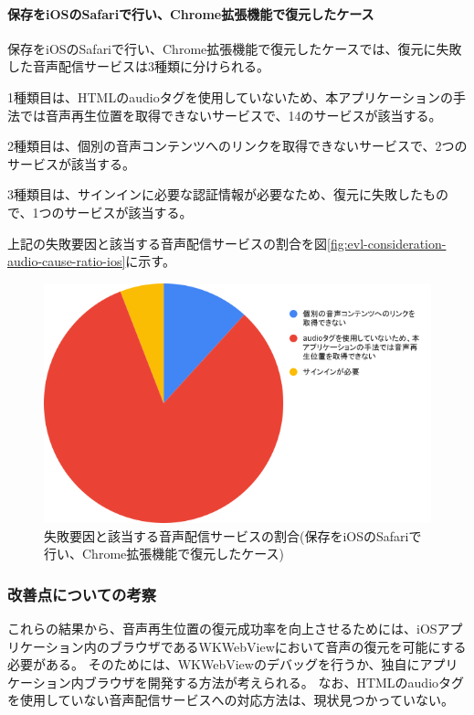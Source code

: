 \paragraph{保存をiOSのSafariで行い、Chrome拡張機能で復元したケース}
保存をiOSのSafariで行い、Chrome拡張機能で復元したケースでは、復元に失敗した音声配信サービスは3種類に分けられる。

1種類目は、HTMLのaudioタグを使用していないため、本アプリケーションの手法では音声再生位置を取得できないサービスで、14のサービスが該当する。

2種類目は、個別の音声コンテンツへのリンクを取得できないサービスで、2つのサービスが該当する。

3種類目は、サインインに必要な認証情報が必要なため、復元に失敗したもので、1つのサービスが該当する。

上記の失敗要因と該当する音声配信サービスの割合を図\ref{fig:evl-consideration-audio-cause-ratio-ios}に示す。

\begin{figure}[htbp]
  \caption{失敗要因と該当する音声配信サービスの割合(保存をiOSのSafariで行い、Chrome拡張機能で復元したケース)}
  \label{fig:evl-consideration-audio-cause-ratio-ios-chrome}
  \begin{center}
    \includegraphics[bb=0 0 600 371,width=15cm]{img/060_evaluation/consideration/audio/cause-ratio-ios-chrome.pdf}
  \end{center}
\end{figure}

\subsubsection{改善点についての考察}
これらの結果から、音声再生位置の復元成功率を向上させるためには、iOSアプリケーション内のブラウザであるWKWebViewにおいて音声の復元を可能にする必要がある。
そのためには、WKWebViewのデバッグを行うか、独自にアプリケーション内ブラウザを開発する方法が考えられる。
なお、HTMLのaudioタグを使用していない音声配信サービスへの対応方法は、現状見つかっていない。